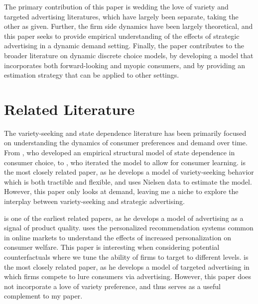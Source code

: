 \documentclass[12pt]{article}
\begin{document}
The primary contribution of this paper is wedding the love of variety and targeted advertising literatures, which have largely been separate, taking the other as given. Further, the firm side dynamics have been largely theoretical, and this paper seeks to provide empirical understanding of the effects of strategic advertising in a dynamic demand setting. Finally, the paper contributes to the broader literature on dynamic discrete choice models, by developing a model that incorporates both forward-looking and myopic consumers, and by providing an estimation strategy that can be applied to other settings.

\section{Related Literature}

    The variety-seeking and state dependence literature has been primarily focused on understanding the dynamics of consumer preferences and demand over time. From \cite{lattin_model_1987}, who developed an empirical structural model of state dependence in consumer choice, to \citet{erdem_decision-making_1996}, who iterated the model to allow for consumer learning. \cite{chintagunta_variety_1999} is the most closely related paper, as he develops a model of variety-seeking behavior which is both tractible and flexible, and uses Nielsen data to estimate the model. However, this paper only looks at demand, leaving me a niche to explore the interplay between variety-seeking and strategic advertising.

    \citet{nelson_information_1970} is one of the earliest related papers, as he develops a model of advertising as a signal of product quality. \cite{zielnicki_value_2025} uses the personalized recommendation systems common in online markets to understand the effects of increased personalization on consumer welfare. This paper is interesting when considering potential counterfactuals where we tune the ability of firms to target to different levels. \cite{shin_targeted_nodate} is the most closely related paper, as he develops a model of targeted advertising in which firms compete to lure consumers via advertising. However, this paper does not incorporate a love of variety preference, and thus serves as a useful complement to my paper.

\end{document}
